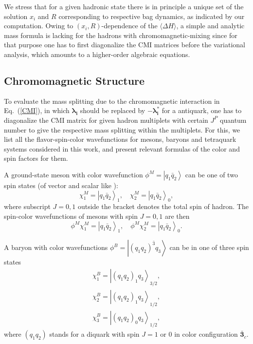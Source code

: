 \documentclass[prt,twocolumn,floatfix,nofootinbib]{revtex4}
\begin{document}
We stress that for a given hadronic state there is in principle a unique set of the solution $x_{i}$ and $R$ corresponding to respective bag dynamics, as indicated by our computation. Owing to $(x_{i},R)$-dependence of the $\langle \Delta H \rangle$, a simple and analytic mass formula is lacking for the hadrons with chromomagnetic-mixing since for that purpose one has to first diagonalize the CMI matrices before the variational analysis, which amounts to a higher-order algebraic equations.


\subsection{Chromomagnetic Structure}
To evaluate the mass splitting due to the chromomagnetic interaction in Eq.~(\ref{CMI}), in which $\boldsymbol{\lambda_{i}}$ should be replaced by $-\boldsymbol{\lambda_{i}^{\ast}}$ for a antiquark, one has to diagonalize
the CMI matrix for given hadron multiplets with certain $J^{P}$ quantum number to give the respective mass splitting \cite{Luo:2017eub} within the multiplets. For this, we list all the flavor-spin-color wavefunctions for mesons, baryons and tetraquark systems considered in this work, and present relevant formulas of the color and spin factors for them.

A ground-state meson with color wavefunction $\phi^{M}=\left| q_{1}\bar{q}_{2} \right\rangle$
can be one of two spin states (of vector and scalar like ):
\begin{equation}\label{spinM}
    \chi_{1}^{M}={\left| q_{1}\bar{q}_{2} \right\rangle}_{1}, \quad \chi_{2}^{M}={\left| q_{1}\bar{q}_{2} \right\rangle}_{0},
\end{equation}
where subscript $J=0,1$ outside the bracket denotes the total spin of hadron. The spin-color wavefunctions of mesons with spin $J=0,1$ are then
\begin{equation}\label{colorspinM}
    \phi^{M}\chi_{1}^{M}={\left| q_{1}\bar{q}_{2} \right\rangle}_{1}, \quad \phi^{M}\chi_{2}^{M}={\left| q_{1}\bar{q}_{2} \right\rangle}_{0}.
\end{equation}

A baryon with color wavefunctions $\phi^{B}=\left| {\left(q_{1}q_{2}\right)}^{\bar{3}} q_{3} \right\rangle$
can be in one of three spin states
\begin{equation}\label{spinB}
    \begin{aligned}
        \chi_{1}^{B}={\left| {\left(q_{1}q_{2}\right)}_{1} q_{3} \right\rangle}_{3/2}, \\
        \chi_{2}^{B}={\left| {\left(q_{1}q_{2}\right)}_{1} q_{3} \right\rangle}_{1/2}, \\
        \chi_{3}^{B}={\left| {\left(q_{1}q_{2}\right)}_{0} q_{3} \right\rangle}_{1/2},
    \end{aligned}
\end{equation}
where $\left(q_{1}q_{2}\right)$ stands for a diquark with spin $J=1$ or $0$ in color configuration $\boldsymbol{\bar{3}}_{c}$.
\end{document}
